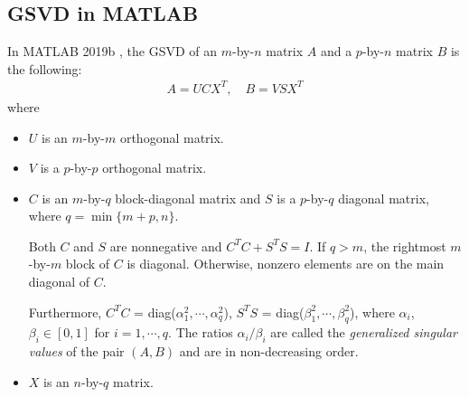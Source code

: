 \subsection{GSVD in MATLAB} \label{def_mat}
In MATLAB 2019b \cite{MATLAB:2019}, the GSVD of an $m$-by-$n$ matrix $A$ 
and a $p$-by-$n$ matrix $B$ is the following:
\begin{align}  \label{eq:gsvdbymatlab} 
A = UCX^T, \quad B = VSX^T
\end{align}
where 
\begin{itemize}
\item $U$ is an $m$-by-$m$ orthogonal matrix.

\item $V$ is a $p$-by-$p$ orthogonal matrix.

\item $C$ is an $m$-by-$q$ block-diagonal matrix 
and $S$ is a $p$-by-$q$ diagonal matrix, where $q = \min\{m + p, n\}$. 

Both $C$ and $S$ are nonnegative and $C^T C + S^T S = I$. 
If $q > m$, the rightmost $m$-by-$m$ block of $C$ is diagonal. 
Otherwise, nonzero elements are on the main diagonal of $C$.

Furthermore, $C^T C $ = diag($\alpha_1^{2}, \cdots, \alpha_q^{2}$), 
$S^T S$ = diag($\beta_1^{2}, \cdots, \beta_q^{2}$), 
where $\alpha_i$, $\beta_i \in [0, 1]$ for $i = 1,\cdots, q$. 
The ratios $\alpha_i/\beta_i$ are called the 
{\em generalized singular values} of the pair $(A, B)$ 
and are in non-decreasing order.

\item $X$ is an $n$-by-$q$ matrix.  
\end{itemize}

